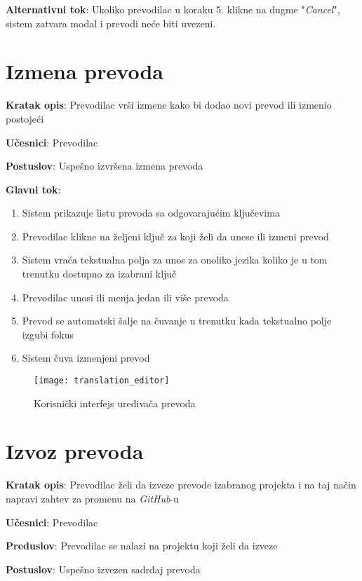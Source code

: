 \textbf{Alternativni tok}: Ukoliko prevodilac u koraku 5. klikne na dugme "\textit{Cancel}", 
sistem zatvara modal i prevodi neće biti uvezeni.


\section{Izmena prevoda}

\textbf{Kratak opis}: Prevodilac vrši izmene kako bi dodao novi prevod ili izmenio postojeći

\textbf{Učesnici}: Prevodilac

\textbf{Postuslov}: Uspešno izvršena izmena prevoda

\textbf{Glavni tok}:
\begin{enumerate}
    \item Sistem prikazuje listu prevoda sa odgovarajućim ključevima
    \item Prevodilac klikne na željeni ključ za koji želi da unese ili izmeni prevod
    \item Sistem vraća tekstualna polja za unos za onoliko jezika koliko je u tom 
    trenutku dostupno za izabrani ključ
    \item Prevodilac unosi ili menja jedan ili više prevoda
    \item Prevod se automatski šalje na čuvanje u trenutku kada tekstualno polje izgubi fokus
    \item Sistem čuva izmenjeni prevod
\end{enumerate}

\begin{figure}[H]
    \centering
    \texttt{[image: translation\_editor]}
    \caption{Korisnički interfejs uređivača prevoda}
\end{figure}


\section{Izvoz prevoda}

\textbf{Kratak opis}: Prevodilac želi da izveze prevode izabranog projekta i 
na taj način napravi zahtev za promenu na \textit{GitHub}-u

\textbf{Učesnici}: Prevodilac

\textbf{Preduslov}: Prevodilac se nalazi na projektu koji želi da izveze

\textbf{Postuslov}: Uspešno izvezen sadrđaj prevoda

